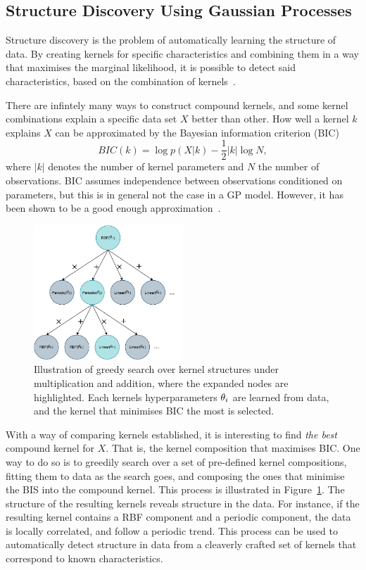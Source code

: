 \subsection{Structure Discovery Using Gaussian Processes}
Structure discovery is the problem of automatically learning the
structure of data. By creating kernels for specific characteristics
and combining them in a way that maximises the marginal likelihood, it
is possible to detect said characteristics, based on the combination
of kernels~\cite{duvenaud2013structure}.

There are infintely many ways to construct compound kernels, and some
kernel combinations explain a specific data set $X$ better than
other. How well a kernel $k$ explains $X$ can be approximated
by the Bayesian information criterion (BIC)
\begin{equation}
  BIC(k) = \log p(X \vert k) - \frac{1}{2} \vert k \vert \log N,
\end{equation}
where $\vert k \vert$ denotes the number of kernel parameters and $N$
the number of observations. BIC assumes independence between
observations conditioned on parameters, but this is in general not the
case in a GP model. However, it has been shown to be a good enough approximation~\cite{duvenaud2013structure}.
\begin{figure}
  \centering
  \includegraphics[width=0.5\textwidth]{figures/compound-kernel-search}
  \caption{Illustration of greedy search over kernel structures under
    multiplication and addition, where the
    expanded nodes are highlighted. Each kernels hyperparameters
    $\theta_i$ are learned from data, and the kernel that
    minimises BIC the most is selected.}\label{fig:compound-kernel-search}
\end{figure}

With a way of comparing kernels established, it is interesting to find
\textit{the best} compound kernel for $X$. That is, the kernel
composition that maximises BIC. One way to do so is to
greedily search over a set of pre-defined kernel compositions, fitting
them to data as the search goes, and composing the ones that minimise
the BIS into the compound kernel. This process is illustrated in Figure~\ref{fig:compound-kernel-search}.
The structure of the resulting kernels reveals structure in the
data. For instance, if the resulting kernel contains a RBF component and a periodic
component, the data is locally correlated, and follow a periodic
trend. This process can be used to automatically detect structure in
data from a cleaverly crafted set of kernels that correspond to
known characteristics.

